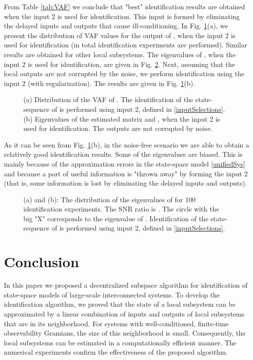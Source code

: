 \documentclass[journal,10pt]{IEEEtran}
\begin{document}
From Table \ref{tab:VAF} we conclude that "best" identification results are obtained when the input 2 is used for identification. This input is formed by eliminating the delayed inputs and outputs that cause ill-conditioning. In Fig. \ref{fig:Nonoise}(a), we present the distribution of VAF values for the output of , when the input 2 is used for identification (in total  identification experiments are performed). Similar results are obtained for other local subsystems. The eigenvalues of , when the input 2 is used for identification, are given in Fig. \ref{eigenvalues}. Next, assuming that the local outputs are not corrupted by the noise, we perform identification using the input 2 (with regularization). The results are given in Fig. \ref{fig:Nonoise}(b).
\begin{figure}[H]
\centering
 \;\;
 \;\;
 \caption{\small{(a) Distribution of the VAF of . The identification of the state-sequence of  is performed using input 2, defined in \eqref{inputSelections}. (b) Eigenvalues of the estimated matrix  and , when the input 2 is used for identification. The outputs are not corrupted by noise.}}
\label{fig:Nonoise}
\end{figure}
As it can be seen from Fig. \ref{fig:Nonoise}(b), in the noise-free scenario we are able to obtain a relatively good identification results. Some of the eigenvalues are biased. This is mainly because of the approximation errors in the state-space model \eqref{unifiedSys} and because a part of useful information is "thrown away" by forming the input 2 (that is, some information is lost by eliminating the delayed inputs and outputs).
\begin{figure}[H]
\centering
 \;\;
 \;\;
 \caption{\small{(a) and (b): The distribution of the eigenvalues of  for 100 identification experiments. The SNR ratio is  . The circle with the big "X" corresponds to the eigenvalue of . Identification of the state-sequence of  is performed using input 2, defined in \eqref{inputSelections}.}}
\label{eigenvalues}
\end{figure}
\section{Conclusion}
\label{sectionConclusion}
In this paper we proposed a decentralized subspace algorithm for identification of state-space models of large-scale interconnected systems. To develop the identification algorithm, we proved that the state of a local subsystem can be approximated by a linear combination of inputs and outputs of local subsystems that are in its neighborhood. For systems with well-conditioned, finite-time observability Gramians, the size of this neighborhood is small. Consequently, the local subsystems can be estimated in a computationally efficient manner. The numerical experiments confirm the effectiveness of the proposed algorithm. 


\end{document}
